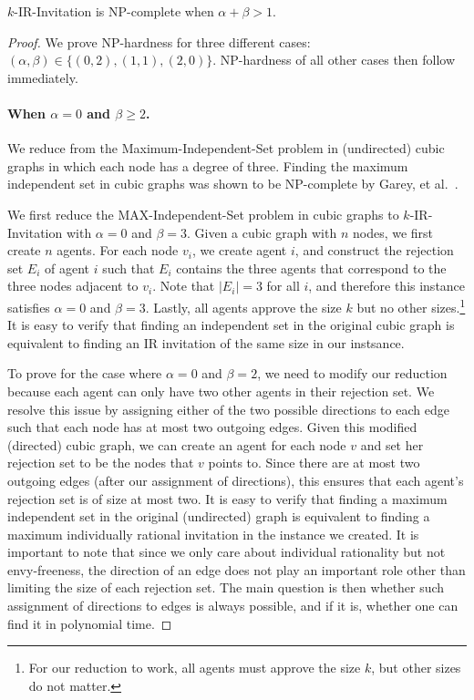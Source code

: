 \begin{theorem} \label{SIP:thm:IR_invitation_NPC}
	$k$-IR-Invitation is NP-complete when $\alpha + \beta > 1$.
\end{theorem} 
\begin{proof} 

We prove NP-hardness for three different cases: $(\alpha,\beta) \in\{(0,2), (1,1), (2,0)\}$. NP-hardness of all other cases then follow immediately. 
	
\paragraph{When $\alpha = 0$ and $\beta \geq 2$.}
	
	We reduce from the Maximum-Independent-Set problem in (undirected) cubic graphs in which each node has a degree of three. Finding the maximum independent set in cubic graphs was shown to be NP-complete by Garey, et al.~\cite{Garey_Max_Is_Cubic}. 
	
	We first reduce the MAX-Independent-Set problem in cubic graphs to $k$-IR-Invitation with $\alpha=0$ and $\beta=3$. Given a cubic graph with $n$ nodes, we first create $n$ agents. For each node $v_i$, we create agent $i$, and construct the rejection set $E_i$ of agent $i$ such that $E_i$ contains the three agents that correspond to the three nodes adjacent to $v_i$.  Note that $|E_i| = 3$ for all $i$, and therefore this instance satisfies $\alpha = 0$ and $\beta = 3$. Lastly, all agents approve the size $k$ but no other sizes.\footnote{For our reduction to work, all agents must approve the size $k$, but other sizes do not matter.}	
	It is easy to verify that finding an independent set in the original cubic graph is equivalent to finding an IR invitation of the same size in our instsance. 
	
	To prove for the case where $\alpha=0$ and $\beta=2$, we need to modify our reduction because each agent can only have two other agents in their rejection set.  We resolve this issue by assigning either of the two possible directions to each edge such that each node has at most two outgoing edges. Given this modified (directed) cubic graph, we can create an agent for each node $v$ and set her rejection set to be the nodes that $v$ points to. Since there are at most two outgoing edges (after our assignment of directions), this ensures that each agent's rejection set is of size at most two. It is easy to verify that finding a maximum independent set in the original (undirected) graph is equivalent to finding a maximum individually rational invitation in the instance we created. It is important to note that since we only care about individual rationality but not envy-freeness, the direction of an edge does not play an important role other than limiting the size of each rejection set.  The main question is then whether such assignment of directions to edges is always possible, and if it is, whether one can find it in polynomial time. 


\end{proof}
